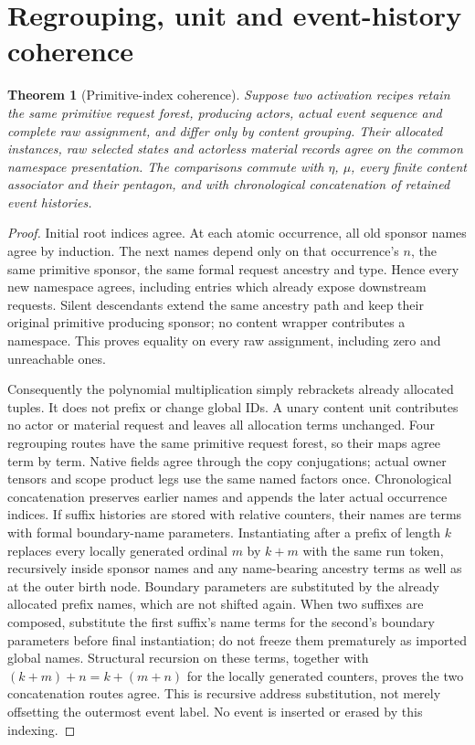\documentclass[11pt]{article}
\newtheorem{theorem}{Theorem}\newtheorem{proposition}{Proposition}
\begin{document}
\section{Regrouping, unit and event-history coherence}
\begin{theorem}[Primitive-index coherence]
Suppose two activation recipes retain the same primitive request forest, producing actors, actual event sequence and complete raw assignment, and differ only by content grouping. Their allocated instances, raw selected states and actorless material records agree on the common namespace presentation. The comparisons commute with $\eta$, $\mu$, every finite content associator and their pentagon, and with chronological concatenation of retained event histories.
\end{theorem}
\begin{proof}
Initial root indices agree. At each atomic occurrence, all old sponsor names agree by induction. The next names depend only on that occurrence's $n$, the same primitive sponsor, the same formal request ancestry and type. Hence every new namespace agrees, including entries which already expose downstream requests. Silent descendants extend the same ancestry path and keep their original primitive producing sponsor; no content wrapper contributes a namespace. This proves equality on every raw assignment, including zero and unreachable ones.

Consequently the polynomial multiplication simply rebrackets already allocated tuples. It does not prefix or change global IDs. A unary content unit contributes no actor or material request and leaves all allocation terms unchanged. Four regrouping routes have the same primitive request forest, so their maps agree term by term. Native fields agree through the copy conjugations; actual owner tensors and scope product legs use the same named factors once. Chronological concatenation preserves earlier names and appends the later actual occurrence indices. If suffix histories are stored with relative counters, their names are terms with formal boundary-name parameters. Instantiating after a prefix of length $k$ replaces every locally generated ordinal $m$ by $k+m$ with the same run token, recursively inside sponsor names and any name-bearing ancestry terms as well as at the outer birth node. Boundary parameters are substituted by the already allocated prefix names, which are not shifted again. When two suffixes are composed, substitute the first suffix's name terms for the second's boundary parameters before final instantiation; do not freeze them prematurely as imported global names. Structural recursion on these terms, together with $(k+m)+n=k+(m+n)$ for the locally generated counters, proves the two concatenation routes agree. This is recursive address substitution, not merely offsetting the outermost event label. No event is inserted or erased by this indexing.\end{proof}
\end{document}
